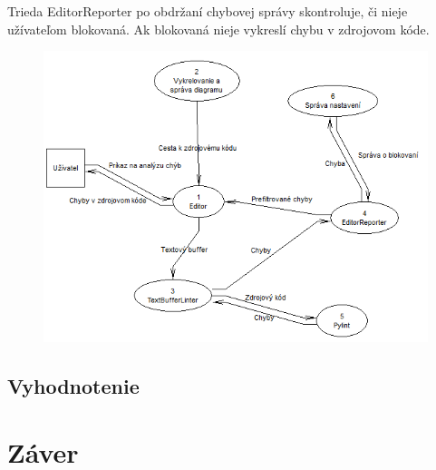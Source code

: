 \documentclass[11pt,oneside,final]{fithesis2}
\begin{document}
		Trieda EditorReporter po obdržaní chybovej správy skontroluje, či nieje užívateľom blokovaná. Ak blokovaná nieje vykreslí chybu v zdrojovom kóde.
		

	
	\begin{figure}[htb]
	 \centering
	 \includegraphics[width=\textwidth]{images/dfd_editor}
	\end{figure}


		
	\section{Vyhodnotenie}	

\chapter{Záver}
\end{document}
